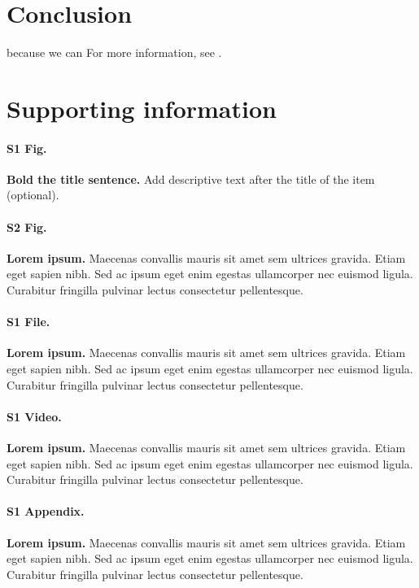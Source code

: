 \documentclass[10pt,letterpaper]{article}
\begin{document}
\section*{Conclusion}

because we can For more information, see .

\section*{Supporting information}

\paragraph*{S1 Fig.}
\label{S1_Fig}
{\bf Bold the title sentence.} Add descriptive text after the title of the item (optional).

\paragraph*{S2 Fig.}
\label{S2_Fig}
{\bf Lorem ipsum.} Maecenas convallis mauris sit amet sem ultrices gravida. Etiam eget sapien nibh. Sed ac ipsum eget enim egestas ullamcorper nec euismod ligula. Curabitur fringilla pulvinar lectus consectetur pellentesque.

\paragraph*{S1 File.}
\label{S1_File}
{\bf Lorem ipsum.}  Maecenas convallis mauris sit amet sem ultrices gravida. Etiam eget sapien nibh. Sed ac ipsum eget enim egestas ullamcorper nec euismod ligula. Curabitur fringilla pulvinar lectus consectetur pellentesque.

\paragraph*{S1 Video.}
\label{S1_Video}
{\bf Lorem ipsum.}  Maecenas convallis mauris sit amet sem ultrices gravida. Etiam eget sapien nibh. Sed ac ipsum eget enim egestas ullamcorper nec euismod ligula. Curabitur fringilla pulvinar lectus consectetur pellentesque.

\paragraph*{S1 Appendix.}
\label{S1_Appendix}
{\bf Lorem ipsum.} Maecenas convallis mauris sit amet sem ultrices gravida. Etiam eget sapien nibh. Sed ac ipsum eget enim egestas ullamcorper nec euismod ligula. Curabitur fringilla pulvinar lectus consectetur pellentesque.
\end{document}
